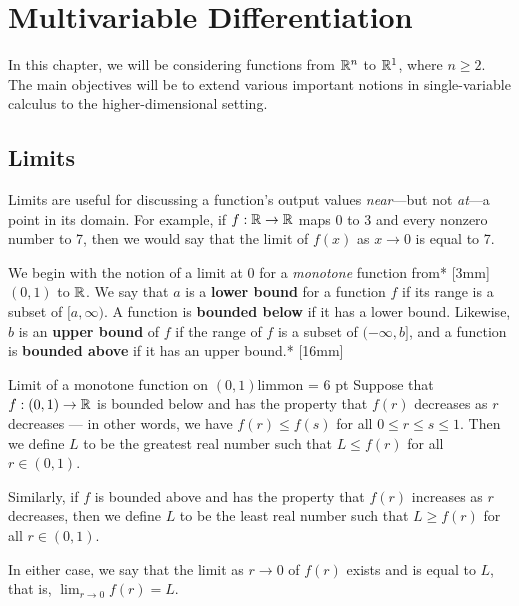 \documentclass[prettycode,shellescape]{watsonbook}
\begin{document}
\chapter{Multivariable Differentiation}

In this chapter, we will be considering functions from $\mathbb{R}^n$ to
$\mathbb{R}^1$, where $n \geq 2$. The main objectives will be to extend
various important notions in single-variable calculus to the
higher-dimensional setting.

\section{Limits} \label{sec:limits}

Limits are useful for discussing a function's output values
\textit{near}---but not \textit{at}---a point in its domain. For
example, if $f:\mathbb{R} \to \mathbb{R}$ maps 0 to 3 and every nonzero number to 7,
then we would say that the limit of $f(x)$ as $x\to 0$ is equal to 7. 

We begin with the notion of a limit at 0 for a \textit{monotone}
function from* [3mm]
$(0,1)$ to $\mathbb{R}$. We say that $a$ is a \textbf{lower bound} for a
function $f$ if its range is a subset of $[a,\infty)$. A function is
\textbf{bounded below} if it has a lower bound. Likewise, $b$ is an
\textbf{upper bound} of $f$ if the range of $f$ is a subset of $(-\infty,b]$,
and a function is \textbf{bounded above} if it has an upper
bound.* [16mm]

\begin{defn}{Limit of a monotone function on $(0,1)$}{limmon} \parskip = 6 pt 
  Suppose that $f:(0,1) \to \mathbb{R}$ is bounded below and has the property
  that $f(r)$ decreases as $r$ decreases --- in other words,
  we have $f(r) \leq f(s)$ for all $0 \leq r \leq s \leq 1$. Then we define
  $L$ to be the greatest real number such that $L \leq f(r)$ for all
  $r\in (0,1)$. 

  Similarly, if $f$ is bounded above and has the property that $f(r)$
  increases as $r$ decreases, then we define $L$ to be the least real
  number such that $L \geq f(r)$ for all $r \in (0,1)$.

  In either case, we say that the limit as $r\to0$ of $f(r)$ exists
  and is equal to $L$, that is,
  $\displaystyle{\lim_{r\to 0} f(r) = L}$.
\end{defn}
\end{document}
